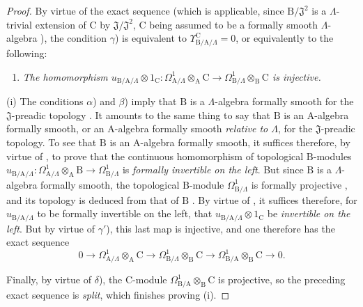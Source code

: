 \begin{proof}
By virtue of the exact sequence  (which is applicable, since $\mathrm{B}/\mathfrak{J}^2$ is a $\Lambda$-trivial extension of $\mathrm{C}$ by $\mathfrak{J}/\mathfrak{J}^2$, $\mathrm{C}$ being assumed to be a formally smooth $\Lambda$-algebra ), the condition $\gamma$) is equivalent to $\Upsilon^{\mathrm{C}}_{\mathrm{B}/\mathrm{A}/\Lambda}=0$, or equivalently to the following:
\begin{enumerate}
  \item[$\gamma'$)] \emph{The homomorphism $u_{\mathrm{B}/\mathrm{A}/\Lambda}\otimes 1_\mathrm{C}:\Omega^1_{\mathrm{A}/\Lambda}\otimes_\mathrm{A}\mathrm{C}\to\Omega^1_{\mathrm{B}/\Lambda}\otimes_\mathrm{B}\mathrm{C}$ is injective.}
\end{enumerate}

(i) The conditions $\alpha$) and $\beta$) imply that $\mathrm{B}$ is a $\Lambda$-algebra formally smooth for the $\mathfrak{J}$-preadic topology .
It amounts to the same thing to say that $\mathrm{B}$ is an $\mathrm{A}$-algebra formally smooth, or an $\mathrm{A}$-algebra formally smooth \emph{relative to $\Lambda$}, for the $\mathfrak{J}$-preadic topology.
To see that $\mathrm{B}$ is an $\mathrm{A}$-algebra formally smooth, it suffices therefore, by virtue of , to prove that the continuous homomorphism of topological $\mathrm{B}$-modules $u_{\mathrm{B}/\mathrm{A}/\Lambda}:\Omega^1_{\mathrm{A}/\Lambda}\otimes_\mathrm{A}\mathrm{B}\to\Omega^1_{\mathrm{B}/\Lambda}$ is \emph{formally invertible on the left}.
But since $\mathrm{B}$ is a $\Lambda$-algebra formally smooth, the topological $\mathrm{B}$-module $\Omega^1_{\mathrm{B}/\Lambda}$ is formally projective , and its topology is deduced from that of $\mathrm{B}$ .
By virtue of , it suffices therefore, for $u_{\mathrm{B}/\mathrm{A}/\Lambda}$ to be formally invertible on the left, that $u_{\mathrm{B}/\mathrm{A}/\Lambda}\otimes 1_\mathrm{C}$ be \emph{invertible on the left}.
But by virtue of $\gamma'$), this last map is injective, and one therefore has the exact sequence 
\[
  0\to\Omega^1_{\mathrm{A}/\Lambda}\otimes_\mathrm{A}\mathrm{C}\to\Omega^1_{\mathrm{B}/\Lambda}\otimes_\mathrm{B}\mathrm{C}\to\Omega^1_{\mathrm{B}/\mathrm{A}}\otimes_\mathrm{B}\mathrm{C}\to 0.
\]

Finally, by virtue of $\delta$), the $\mathrm{C}$-module $\Omega^1_{\mathrm{B}/\mathrm{A}}\otimes_\mathrm{B}\mathrm{C}$ is projective, so the preceding exact sequence is \emph{split}, which finishes proving (i).


\end{proof}
